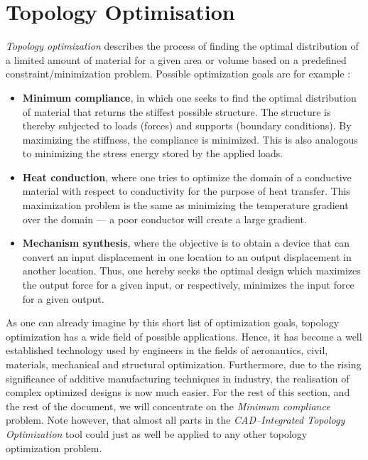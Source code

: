 \section{Topology Optimisation}
\label{sec:TopOpt}
\emph{Topology optimization} describes the process of finding the optimal distribution of a limited amount of material for a given area or volume based on a predefined constraint/minimization problem. Possible optimization goals are for example \cite{Hunter2009}:
\begin{itemize}
\item \textbf{Minimum compliance}, in which one seeks to find the optimal distribution of material that returns the stiffest possible structure. The structure is thereby subjected to loads (forces) and supports (boundary conditions). By maximizing the stiffness, the compliance is minimized. This is also analogous to minimizing the stress energy stored by the applied loads.
\item \textbf{Heat conduction}, where one tries to optimize the domain of a conductive material with respect to conductivity for the purpose of heat transfer. This maximization problem is the same as minimizing the temperature gradient over the domain --- a poor conductor will create a large gradient.
\item \textbf{Mechanism synthesis}, where the objective is to obtain a device that can convert an input displacement in one location to an output displacement in another location. Thus, one hereby seeks the optimal design which maximizes the output force for a given input, or respectively, minimizes the input force for a given output.
\end{itemize}


As one can already imagine by this short list of optimization goals, topology optimization has a wide field of possible applications. Hence, it has become a well established technology used by engineers in the fields of aeronautics, civil, materials, mechanical and structural optimization. Furthermore, due to the rising significance of additive manufacturing techniques in industry, the realisation of complex optimized designs is now much easier. 
For the rest of this section, and the rest of the document, we will concentrate on the \emph{Minimum compliance} problem. Note however, that almost all parts in the \emph{CAD--Integrated Topology Optimization} tool could just as well be applied to any other topology optimization problem. 

